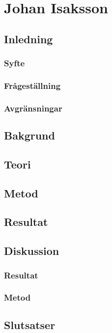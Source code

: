 \section{Johan Isaksson}
	\subsection{Inledning}
	\subsubsection{Syfte}
	\subsubsection{Frågeställning}
	\subsubsection{Avgränsningar}
	\subsection{Bakgrund}
	\subsection{Teori}
	\subsection{Metod}
	\subsection{Resultat}
	\subsection{Diskussion}
	\subsubsection{Resultat}
	\subsubsection{Metod}
	\subsection{Slutsatser}

